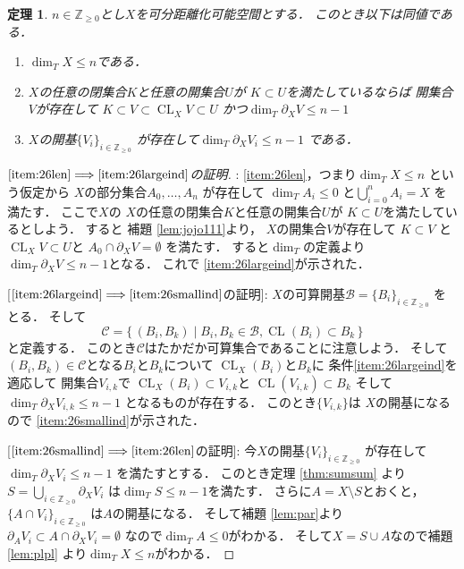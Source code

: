 \documentclass[leqno, a4paper, 12pt]{jsarticle}
\newtheorem{thm}{定理}
\newcommand{\To}{\Longrightarrow}
\newcommand{\zz}{\mathbb{Z}}
\DeclareMathOperator{\cl}{CL}
\numberwithin{equation}{section}
\begin{document}
\begin{thm}\label{thm:boundary2222}
$n\in \zz_{\ge 0}$とし$X$を可分距離化可能空間とする．
このとき以下は同値である．
\begin{enumerate}[label=\textup{(\arabic*)}]
\item\label{item:26len}
$\dim_{T} X\le n$である．
\item\label{item:26largeind}
$X$の任意の閉集合$K$と任意の開集合$U$が
$K\subset U$を満たしているならば
開集合$V$が存在して
$K\subset V\subset \cl_{X}V\subset U$
かつ$\dim_{T}\partial_{X}V\le n-1$
\item\label{item:26smallind}
$X$の開基$\{V_{i}\}_{i\in \zz_{\ge 0}}$
が存在して$\dim_{T}\partial_{X} V_{i}\le n-1$
である．
\end{enumerate}
\end{thm}
\begin{proof}
[$\ref{item:26len}\To \ref{item:26largeind}$の証明]: 
\ref{item:26len}，つまり$\dim_{T} X\le n$
という仮定から
$X$の部分集合$A_{0}, \dots, A_{n}$
が存在して
$\dim_{T}A_{i}\le 0$
と$\bigcup_{i=0}^{n}A_{i}=X$
を満たす．
ここで$X$の
$X$の任意の閉集合$K$と任意の開集合$U$が
$K\subset U$を満たしているとしよう．
すると
補題 \ref{lem:jojo111}より，
$X$の開集合$V$が存在して
$K\subset V$
と
$\cl_{X}V\subset U$と
$A_{0}\cap \partial_{X}V=\emptyset$
を満たす．
すると$\dim_{T}$の定義より$\dim_{T}\partial_{X}V\le n-1$となる．
これで
 \ref{item:26largeind}が示された．

[$\ref{item:26largeind}\To \ref{item:26smallind}$の証明]: 
$X$の可算開基$\mathcal{B}=\{B_{i}\}_{i\in \zz_{\ge 0}}$
をとる．
そして
\[
\mathcal{C}=\{\, (B_{i}, B_{k})\mid B_{i}, B_{k}\in\mathcal{B},   \cl(B_{i})\subset B_{k}\, \}
\]
と定義する．
このとき$\mathcal{C}$はたかだか可算集合であることに注意しよう．
そして
$(B_{i}, B_{k})\in \mathcal{C}$となる$B_{i}$と$B_{k}$について
$\cl_{X}(B_{i})$と$B_{k}$に
条件\ref{item:26largeind}を適応して
開集合$V_{i, k}$で
$\cl_{X}(B_{i})\subset V_{i, k}$と
$\cl(V_{i, k})\subset B_{k}$
そして$\dim_{T}\partial_{X}V_{i, k}\le n-1$
となるものが存在する．
このとき$\{V_{i, k}\}$は
$X$の開基になるので
\ref{item:26smallind}が示された．

[$\ref{item:26smallind}\To \ref{item:26len}$の証明]: 
今$X$の開基$\{V_{i}\}_{i\in \zz_{\ge 0}}$
が存在して$\dim_{T}\partial_{X} V_{i}\le n-1$
を満たすとする．
このとき定理 \ref{thm:sumsum}
より$S=\bigcup_{i\in \zz_{\ge 0}}\partial_{X}V_{i}$
は$\dim_{T}S\le n-1$を満たす．
さらに$A=X\setminus S$とおくと，
$\{A\cap V_{i}\}_{i\in \zz_{\ge 0}}$
は$A$の開基になる．
そして補題 \ref{lem:par}より
$\partial_{A}V_{i}\subset A\cap \partial_{X}V_{i}=\emptyset$
なので$\dim_{T}A\le 0$がわかる．
そして$X=S\cup A$なので補題 \ref{lem:plpl}
より$\dim_{T} X\le n$がわかる．
\end{proof}
\end{document}
